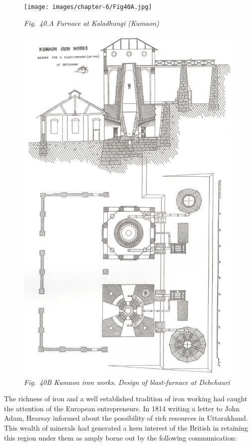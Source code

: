 \begin{figure}[H]
\texttt{[image: images/chapter-6/Fig40A.jpg]}
\caption*{\textit{Fig.~40.A Furnace at Kaladhungi (Kumaon)}}
\end{figure}
\begin{figure}[H]
\includegraphics[scale=.7]{images/chapter-6/Fig40B.jpg}
\caption*{\textit{Fig.~40B Kumaon iron works. Design of blast-furnace at Dehchauri}}
\end{figure}


The richness of iron and a well established tradition of iron working had caught the attention of the European entrepreneurs. In 1814 writing a letter to John Adam, Hearsay informed about the possibility of rich resources in Uttarakhand. This wealth of minerals had generated a keen interest of the British in retaining this region under them as amply borne out by the following communication:

